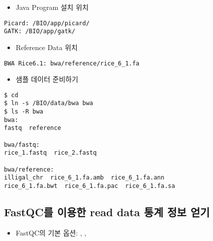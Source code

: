 \documentclass{article}
\begin{document}
\begin{itemize}
\item
  \begin{itemize}
  Java Program 설치 위치  
  \end{itemize}
\end{itemize}
\begin{lstlisting}[frame=single,style=Bash,xleftmargin=1.4cm,xrightmargin=1.4cm]
Picard: /BIO/app/picard/
GATK: /BIO/app/gatk/
\end{lstlisting}

\begin{itemize}
\item
  \begin{itemize}
  Reference Data 위치  
  \end{itemize}
\end{itemize}
\begin{lstlisting}[frame=single,style=Bash,xleftmargin=1.4cm,xrightmargin=1.4cm]
BWA Rice6.1: bwa/reference/rice_6_1.fa
\end{lstlisting}

\begin{itemize}
\item
  \begin{itemize}
  샘플 데이터 준비하기  
  \end{itemize}
\end{itemize}

\begin{lstlisting}[frame=single,style=Bash,xleftmargin=1.4cm,xrightmargin=1.4cm]
$ cd
$ ln -s /BIO/data/bwa bwa
$ ls -R bwa
bwa:
fastq  reference

bwa/fastq:
rice_1.fastq  rice_2.fastq

bwa/reference:
illigal_chr  rice_6_1.fa.amb  rice_6_1.fa.ann  
rice_6_1.fa.bwt  rice_6_1.fa.pac  rice_6_1.fa.sa
\end{lstlisting}

\subsection{FastQC를 이용한 read data 통계 정보 얻기}

\begin{itemize}
\item
  \begin{itemize}
  FastQC의 기본 옵션: , , 
  \end{itemize}
\end{itemize}
\end{document}

